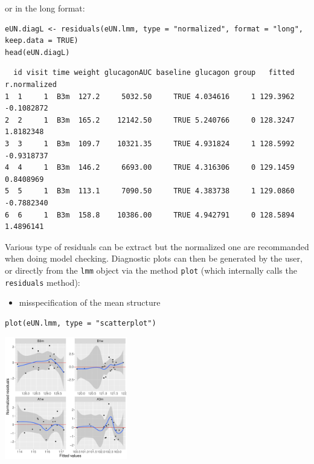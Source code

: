 \documentclass[12pt]{article}
\begin{document}
or in the long format:
\lstset{language=r,label= ,caption= ,captionpos=b,numbers=none}
\begin{lstlisting}
eUN.diagL <- residuals(eUN.lmm, type = "normalized", format = "long", keep.data = TRUE)
head(eUN.diagL)
\end{lstlisting}

\begin{verbatim}
  id visit time weight glucagonAUC baseline glucagon group   fitted r.normalized
1  1     1  B3m  127.2     5032.50     TRUE 4.034616     1 129.3962   -0.1082872
2  2     1  B3m  165.2    12142.50     TRUE 5.240766     0 128.3247    1.8182348
3  3     1  B3m  109.7    10321.35     TRUE 4.931824     1 128.5992   -0.9318737
4  4     1  B3m  146.2     6693.00     TRUE 4.316306     0 129.1459    0.8408969
5  5     1  B3m  113.1     7090.50     TRUE 4.383738     1 129.0860   -0.7882340
6  6     1  B3m  158.8    10386.00     TRUE 4.942791     0 128.5894    1.4896141
\end{verbatim}


Various type of residuals can be extract but the normalized one are
recommanded when doing model checking. Diagnostic plots can then be
generated by the user, or directly from the \texttt{lmm} object via the
method \texttt{plot} (which internally calls the \texttt{residuals} method):
\begin{itemize}
\item misspecification of the mean structure
\end{itemize}
\lstset{language=r,label= ,caption= ,captionpos=b,numbers=none}
\begin{lstlisting}
plot(eUN.lmm, type = "scatterplot")
\end{lstlisting}

\begin{center}
\includegraphics[width=0.4\textwidth]{./figures/diag-scatterplot.pdf}
\end{center}

\clearpage
\end{document}
